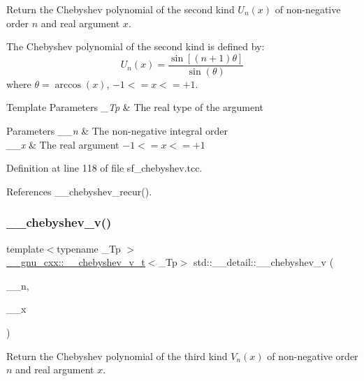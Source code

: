 Return the Chebyshev polynomial of the second kind $ U_n(x) $ of non-\/negative order $ n $ and real argument $ x $.

The Chebyshev polynomial of the second kind is defined by\+: \[ U_n(x) = \frac{\sin \left[(n+1)\theta \right]}{\sin(\theta)} \] where $ \theta = \arccos(x) $, $ -1 <= x <= +1 $.


\begin{DoxyTemplParams}{Template Parameters}
{\em \+\_\+\+Tp} & The real type of the argument \\
\hline
\end{DoxyTemplParams}

\begin{DoxyParams}{Parameters}
{\em \+\_\+\+\_\+n} & The non-\/negative integral order \\
\hline
{\em \+\_\+\+\_\+x} & The real argument $ -1 <= x <= +1 $ \\
\hline
\end{DoxyParams}


Definition at line 118 of file sf\+\_\+chebyshev.\+tcc.



References \+\_\+\+\_\+chebyshev\+\_\+recur().

\mbox{\label{namespacestd_1_1____detail_a2ed217a1032c75d07ff34949de36d653}} 
\subsubsection{\texorpdfstring{\+\_\+\+\_\+chebyshev\+\_\+v()}{\_\_chebyshev\_v()}}
{\footnotesize\ttfamily template$<$typename \+\_\+\+Tp $>$ \\
\hyperlink{struct____gnu__cxx_1_1____chebyshev__v__t}{\+\_\+\+\_\+gnu\+\_\+cxx\+::\+\_\+\+\_\+chebyshev\+\_\+v\+\_\+t}$<$\+\_\+\+Tp$>$ std\+::\+\_\+\+\_\+detail\+::\+\_\+\+\_\+chebyshev\+\_\+v (\begin{DoxyParamCaption}\item[{unsigned int}]{\+\_\+\+\_\+n,  }\item[{\+\_\+\+Tp}]{\+\_\+\+\_\+x }\end{DoxyParamCaption})}

Return the Chebyshev polynomial of the third kind $ V_n(x) $ of non-\/negative order $ n $ and real argument $ x $.

